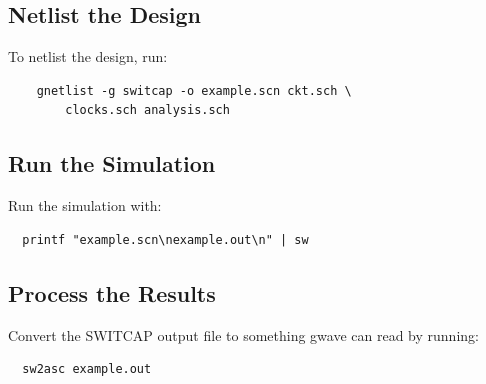 \documentclass{article}
\begin{document}
\subsection{Netlist the Design}
To netlist the design, run:
\begin{verbatim}
    gnetlist -g switcap -o example.scn ckt.sch \ 
        clocks.sch analysis.sch
\end{verbatim}

\subsection{Run the Simulation}
Run the simulation with:
\begin{verbatim}
  printf "example.scn\nexample.out\n" | sw
\end{verbatim}

\subsection{Process the Results}
Convert the SWITCAP output file to something gwave can read by
running:
\begin{verbatim}
  sw2asc example.out
\end{verbatim}
\end{document}
